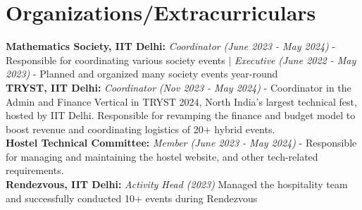 \documentclass[a4paper,10pt]{article}
\begin{document}
\section{\textbf{Organizations/Extracurriculars}}
\textbf{Mathematics Society, IIT Delhi:} \textit{Coordinator} \textit{(June 2023 - May 2024)} - Responsible for coordinating various society events $|$ \textit{Executive} \textit{(June 2022 - May 2023)} - Planned and organized many society events year-round \\
\textbf{TRYST, IIT Delhi:} \textit{Coordinator} \textit{(Nov 2023 - May 2024)} - Coordinator in the Admin and Finance Vertical in TRYST 2024, North India's largest technical fest, hosted by IIT Delhi. Responsible for revamping the finance and budget model to boost revenue and coordinating logistics of 20+ hybrid events. \\
\textbf{Hostel Technical Committee:} \textit{Member (June 2023 - May 2024)} - Responsible for managing and maintaining the hostel website, and other tech-related requirements.\\
\textbf{Rendezvous, IIT Delhi:} \textit{Activity Head (2023)} Managed the hospitality team and successfully conducted 10+ events during Rendezvous\\



\vfill
\end{document}
